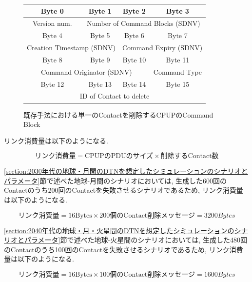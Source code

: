 \begin{figure}[htbp]
    \centering
    \label{figure:delete_command_block_format}
    \begin{tabular}{|c|c|c|c|}
        \hline
        Byte 0 & Byte 1 & Byte 2 & Byte 3 \\
        \hline
        \multicolumn{1}{|c|}{Version num.} & \multicolumn{3}{c|}{Number of Command Blocks (SDNV)} \\
        \hline
        Byte 4 & Byte 5 & Byte 6 & Byte 7  \\
        \hline
        \multicolumn{2}{|c|}{Creation Timestamp (SDNV)} & \multicolumn{2}{c|}{Command Expiry (SDNV)} \\
        \hline
        Byte 8 & Byte 9 & Byte 10 & Byte 11 \\
        \hline
        \multicolumn{3}{|c|}{Command Originator (SDNV)} & Command Type \\
        \hline
        Byte 12 & Byte 13 & Byte 14 & Byte 15 \\
        \hline
        \multicolumn{4}{|c|}{ID of Contact to delete} \\
        \hline
    \end{tabular}
    \caption{既存手法における単一のContactを削除するCPUPのCommand Block}
  \end{figure}

リンク消費量は以下のようになる. 

\begin{equation}
    \text{リンク消費量} = \text{CPUPのPDUのサイズ} \times \text{削除するContact数}
\end{equation}

\ref{section:2030年代の地球・月間のDTNを想定したシミュレーションのシナリオとパラメータ}節で述べた地球-月間のシナリオにおいては, 
生成した600回のContactのうち200回のContactを失敗させるシナリオであるため, リンク消費量は以下のようになる. 

\begin{equation}
    \text{リンク消費量} = 16 \text{Bytes} \times 200 \text{個のContact削除メッセージ} = 3200 {Bytes} 
\end{equation}

\ref{section:2040年代の地球・月・火星間のDTNを想定したシミュレーションのシナリオとパラメータ}節で述べた地球-火星間のシナリオにおいては, 
生成した480回のContactのうち100回のContactを失敗させるシナリオであるため, リンク消費量は以下のようになる. 

\begin{equation}
    \text{リンク消費量} = 16 \text{Bytes} \times 100 \text{個のContact削除メッセージ} = 1600 {Bytes} 
\end{equation}
